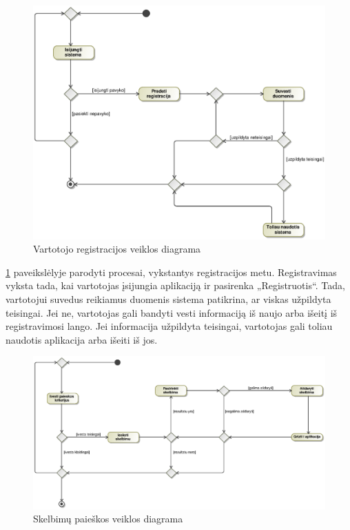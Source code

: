 \documentclass[12pt]{article}
\begin{document}
	\begin{figure}[h]
		\begin{center}
			\includegraphics[width=\textwidth]{RegistracijosVeikla.eps}
			\caption{Vartotojo registracijos veiklos diagrama\label{RegisterActivity}}
		\end{center}
	\end{figure}
	
	\ref{RegisterActivity} paveikslėlyje parodyti procesai, vykstantys registracijos metu. Registravimas vyksta tada, kai vartotojas įsijungia aplikaciją ir pasirenka „Registruotis“. Tada, vartotojui suvedus reikiamus duomenis sistema patikrina, ar viskas užpildyta teisingai. Jei ne, vartotojas gali bandyti vesti informaciją iš naujo arba išeitį iš registravimosi lango. Jei informacija užpildyta teisingai, vartotojas gali toliau naudotis aplikacija arba išeiti iš jos.
	\pagebreak
	
	\begin{figure}[h]
		\begin{center}
			\includegraphics[width=\textwidth]{PaieskosVeikla.eps}
			\caption{Skelbimų paieškos veiklos diagrama\label{SearchActivity}}
		\end{center}
	\end{figure}
	
\end{document}
